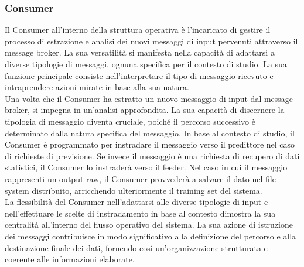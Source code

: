 \subsubsection[Consumer]{Consumer}
Il Consumer all'interno della struttura operativa è l'incaricato di gestire il processo di estrazione e analisi dei nuovi messaggi di input pervenuti attraverso il message broker.
La sua versatilità si manifesta nella capacità di adattarsi a diverse tipologie di messaggi, ognuna specifica per il contesto di studio.
La sua funzione principale consiste nell'interpretare il tipo di messaggio ricevuto e intraprendere azioni mirate in base alla sua natura. \\
Una volta che il Consumer ha estratto un nuovo messaggio di input dal message broker, si impegna in un'analisi approfondita.
La sua capacità di discernere la tipologia di messaggio diventa cruciale, poiché il percorso successivo è determinato dalla natura specifica del messaggio.
In base al contesto di studio, il Consumer è programmato per instradare il messaggio verso il predittore nel caso di richieste di previsione.
Se invece il messaggio è una richiesta di recupero di dati statistici, il Consumer lo instraderà verso il feeder.
Nel caso in cui il messaggio rappresenti un output raw, il Consumer provvederà a salvare il dato nel file system distribuito, arricchendo ulteriormente il training set del sistema. \\
La flessibilità del Consumer nell'adattarsi alle diverse tipologie di input e nell'effettuare le scelte di instradamento in base al contesto dimostra la sua centralità all'interno del flusso operativo del sistema.
La sua azione di istruzione dei messaggi contribuisce in modo significativo alla definizione del percorso e alla destinazione finale dei dati, fornendo così un'organizzazione strutturata e coerente alle informazioni elaborate.

